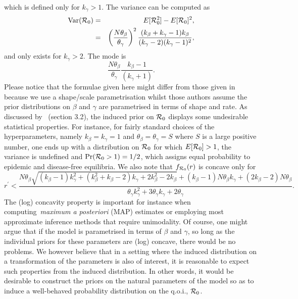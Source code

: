 \documentclass[alpha-refs]{wiley-article}
\newcommand{\rr}{ {\cal R}_0 }						%
\begin{document}
which is defined only for $k_{\gamma} > 1$.
The variance can be computed as
\begin{eqnarray}
\nonumber
\text{Var}(\rr) &=& E[\rr^2] - E[\rr]^2,  \\
\label{eq:var}
 &=& \left(\frac{N\theta_{\beta}}{\theta_{\gamma}}\right)^2\frac{(k_{\beta}+k_{\gamma}-1)k_{\beta}}{(k_{\gamma}-2)(k_{\gamma}-1)^2},
\end{eqnarray}
and only exists for $k_{\gamma} > 2$.
The mode is 
\begin{equation}
\label{eq:mode}
\frac{N\theta_{\beta}}{\theta_{\gamma}}\frac{k_{\beta} - 1}{(k_{\gamma} + 1)}.
\end{equation}
Please notice that the formulae given here might differ from those given in~\cite{Clancy2008} because we use a shape/scale parametrisation whilst those authors assume the prior distributions on $\beta$ and $\gamma$ are parametrised in terms of shape and rate.
As discussed by~\cite{Clancy2008} (section 3.2), the induced prior on $\rr$ displays some undesirable statistical properties.
For instance, for fairly standard choices of the hyperparameters, namely $k_\beta = k_\gamma = 1$ and $\theta_\beta = \theta_\gamma = S$ where $S$ is a large positive number, one ends up with a distribution on $\rr$ for which $E[\rr] > 1$, the variance is undefined and $\text{Pr}(\rr > 1) = 1/2$, which assigns equal probability to epidemic and disease-free equilibria.
We also note that $f_{\rr}(r)$ is concave only for %
\begin{equation}
\label{eq:logconcavity}
r^\prime < \dfrac{N\theta_\beta \sqrt{\left(k_{\beta}-1\right)k_{\gamma}^2+\left(k_{\beta}^2+k_{\beta}-2\right)k_{\gamma}+2k_{\beta}^2-2k_{\beta}}+\left(k_{\beta}-1\right)N\theta_\beta k_{\gamma}+\left(2k_{\beta}-2\right)N\theta_\beta}{\theta_{\gamma} k_{\gamma}^2+3\theta_{\gamma} k_{\gamma}+2\theta_{\gamma}}.
\end{equation}
The (log) concavity property is important for instance when computing~\textit{maximum a posteriori} (MAP) estimates or employing most approximate inference methods that require unimodality.
Of course, one might argue that if the model is parametrised in terms of $\beta$ and $\gamma$, so long as the individual priors for these parameters are (log) concave, there would be no problems.
We however believe that in a setting where the induced distribution on a transformation of the parameters is also of interest, it is reasonable to expect such properties from the induced distribution.
In other words, it would be desirable to construct the priors on the natural parameters of the model so as to induce a well-behaved probability distribution on the q.o.i., $\rr$.
\end{document}
